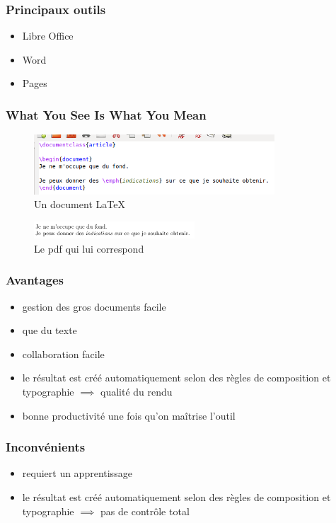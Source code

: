\documentclass{beamer}
\begin{document}
\begin{frame}
  \frametitle{Principaux outils}
  \begin{itemize}
  \item Libre Office
  \item Word
  \item Pages
  \end{itemize}
\end{frame}

\begin{frame}
  \frametitle{What You See Is What You Mean}
  \begin{figure}[H]
    \centering
    \includegraphics[width=9cm]{WYSIWYM}
    \caption{Un document LaTeX}
    \label{fig:ex-LaTeX}
  \end{figure}
  \begin{figure}[H]
    \centering
    \includegraphics[width=6cm]{WYSIWYM-result}
    \caption{Le pdf qui lui correspond}
    \label{fig:ex-pdf}
  \end{figure}
\end{frame}

\begin{frame}
  \frametitle{Avantages}
  \begin{itemize}
  \item gestion des gros documents facile
  \item que du texte
  \item collaboration facile
  \item le résultat est créé automatiquement selon des règles de
    composition et typographie $\implies$ qualité du rendu
  \item bonne productivité une fois qu'on ma\^itrise l'outil
  \end{itemize}
\end{frame}

\begin{frame}
  \frametitle{Inconvénients}
  \begin{itemize}
  \item requiert un apprentissage
  \item le résultat est créé automatiquement selon des règles de
    composition et typographie $\implies$ pas de contr\^ole total
  \end{itemize}
\end{frame}
\end{document}
